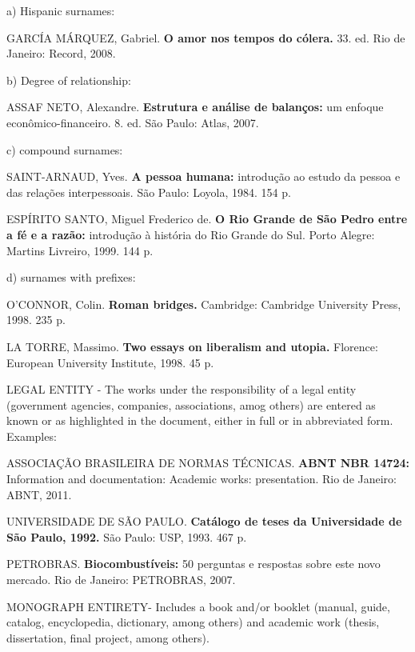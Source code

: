 \documentclass[revista,english,oneside]{ifes8}
\begin{document}
\vspace{2mm}
\noindent a) Hispanic surnames:

GARCÍA MÁRQUEZ, Gabriel. \textbf{O amor nos tempos do cólera.} 33. ed. Rio de Janeiro:
Record, 2008.

\vspace{2mm}
\noindent b) Degree of relationship:

ASSAF NETO, Alexandre. \textbf{Estrutura e análise de balanços:} um enfoque
econômico-financeiro. 8. ed. São Paulo: Atlas, 2007.

\vspace{2mm}
\noindent c) compound surnames:

SAINT-ARNAUD, Yves. \textbf{A pessoa humana:} introdução ao estudo da pessoa e das
relações interpessoais. São Paulo: Loyola, 1984. 154 p.

ESPÍRITO SANTO, Miguel Frederico de. \textbf{O Rio Grande de São Pedro entre a fé e a
razão:} introdução à história do Rio Grande do Sul. Porto Alegre: Martins Livreiro,
1999. 144 p.

\vspace{2mm}
\noindent d) surnames with prefixes:

O'CONNOR, Colin. \textbf{Roman bridges.} Cambridge: Cambridge University Press, 1998.
235 p.

LA TORRE, Massimo. \textbf{Two essays on liberalism and utopia.} Florence: European
University Institute, 1998. 45 p.

\vspace{4mm}
 LEGAL ENTITY - The works under the responsibility of a legal entity
(government agencies, companies, associations, amog others) are entered as known or as
highlighted in the document, either in full or in abbreviated form. Examples:

ASSOCIAÇÃO BRASILEIRA DE NORMAS TÉCNICAS. \textbf{ABNT NBR 14724:} Information and
documentation: Academic works: presentation. Rio de Janeiro: ABNT, 2011.

UNIVERSIDADE DE SÃO PAULO. \textbf{Catálogo de teses da Universidade de São Paulo,
1992.} São Paulo: USP, 1993. 467 p.

PETROBRAS. \textbf{Biocombustíveis:} 50 perguntas e respostas sobre este novo mercado.
Rio de Janeiro: PETROBRAS, 2007.

\vspace{4mm}
 MONOGRAPH ENTIRETY- Includes a book and/or booklet (manual, guide,
catalog, encyclopedia, dictionary, among others) and academic work (thesis,
dissertation, final project, among others).
\end{document}
